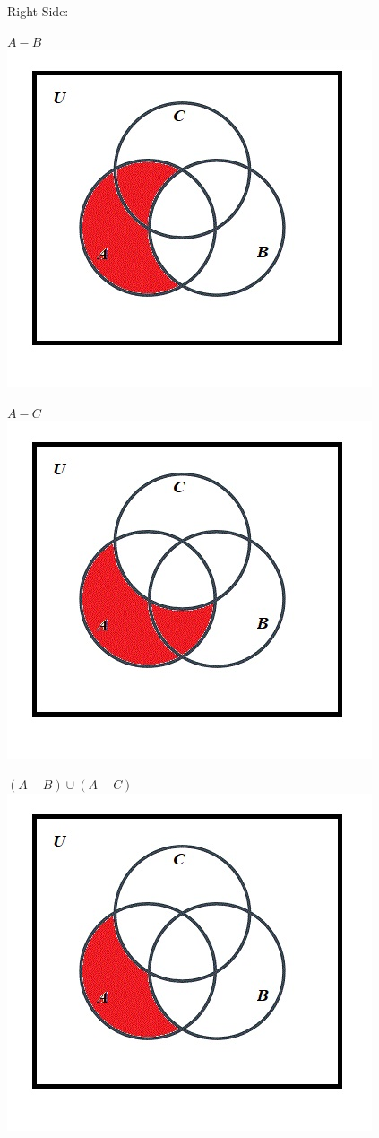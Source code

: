\documentclass[10pt]{article}
\begin{document}
Right Side:

$A - B$\\
\includegraphics[scale=0.55]{18}

$A - C$\\
\includegraphics[scale=0.55]{23}

$(A - B) \cup (A - C)$\\
\includegraphics[scale=0.55]{25}
\end{document}
